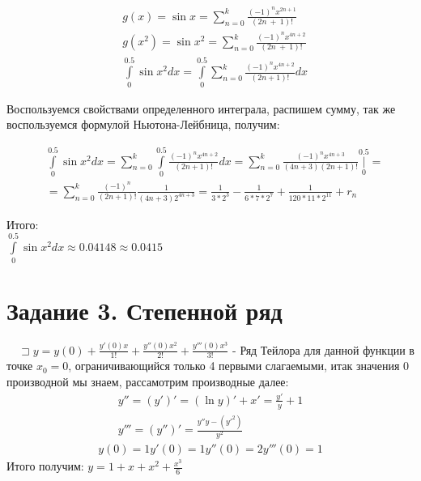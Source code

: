 \documentclass{article}
\begin{document}
\[
\begin{split}
    &g(x) = \sin{x}
     = \sum_{n=0}^{k}\frac{\left(-1\right)^{n}x^{2n+1}}{\left(2n\ +\ 1\right)!}\\
    &g(x^2) = \sin{x^2}
     = \sum_{n=0}^{k}\frac{\left(-1\right)^{n}x^{4n+2}}{\left(2n\ +\ 1\right)!} \\
    &\int\limits_{0}^{0.5}\sin{x^2}dx = \int\limits_{0}^{0.5}\sum_{n=0}^{k}\frac{(-1)^{n}x^{4n+2}}{(2n+1)!}dx
\end{split}
\]

Воспользуемся свойствами определенного интеграла, распишем сумму, так же воспользуемся формулой Ньютона-Лейбница, получим:

\[
\begin{split}
&\int\limits_{0}^{0.5}\sin{x^2}dx = \sum_{n=0}^{k}\int\limits_{0}^{0.5}\frac{(-1)^{n}x^{4n+2}}{(2n+1)!}dx = \sum_{n=0}^{k}\frac{(-1)^{n}x^{4n+3}}{(4n+3)(2n+1)!}\bigg|\limits_{0}^{0.5} = \\
&=\sum_{n=0}^{k}\frac{(-1)^n}{(2n+1)!}\frac{1}{(4n + 3)2^{4n+3}} = \frac{1}{3*2^3} - \frac{1}{6 * 7 * 2^7} + \frac{1}{120 * 11 * 2^{11}} + r_n 
\end{split}
\]

Итого: 
\\
$\int\limits_{0}^{0.5}\sin{x^2}dx \approx 0.04148 \approx 0.0415$

\section{Задание 3. Степенной ряд}

$\quad\sqsupset y = y(0) + \frac{y'(0)x}{1!} + \frac{y''(0)x^2}{2!} + \frac{y'''(0)x^3}{3!}$ - Ряд Тейлора для данной функции в точке $x_0 = 0$, ограничивающийся только 4 первыми слагаемыми, итак значения 0 производной мы знаем, рассамотрим производные далее:
\begin{align}
    y'' = (y')' = (\ln{y})' + x' = \frac{y'}{y} + 1\\
    y''' = (y'')' = \frac{y''y - (y'^2)}{y^2}
\end{align}
\begin{align}    
    y(0) = 1
    y'(0) = 1
    y''(0) = 2
    y'''(0) = 1
\end{align}
Итого получим:
$y = 1 + x + x^2 + \frac{x^3}{6}$
\end{document}
